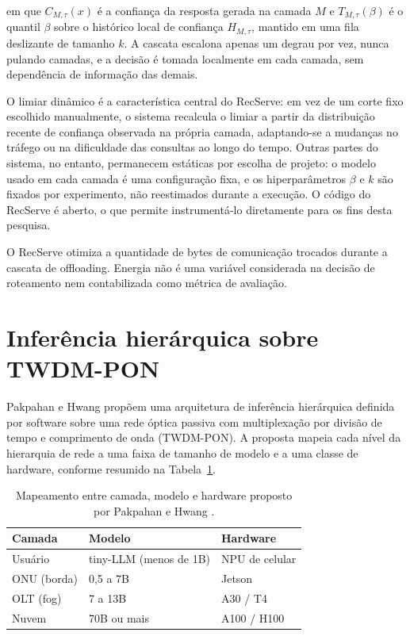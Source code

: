 \documentclass[cic,dipl]{infufrgs}
\begin{document}
em que $C_{M,\tau}(x)$ \'e a confian\c{c}a da resposta gerada na camada
$M$ e $T_{M,\tau}(\beta)$ \'e o quantil $\beta$ sobre o hist\'orico local
de confian\c{c}a $H_{M,\tau}$, mantido em uma fila deslizante de tamanho
$k$. A cascata escalona apenas um degrau por vez, nunca pulando
camadas, e a decis\~ao \'e tomada localmente em cada camada, sem
depend\^encia de informa\c{c}\~ao das demais.

O limiar din\^amico \'e a caracter\'istica central do RecServe: em vez de
um corte fixo escolhido manualmente, o sistema recalcula o limiar a
partir da distribui\c{c}\~ao recente de confian\c{c}a observada na
pr\'opria camada, adaptando-se a mudan\c{c}as no tr\'afego ou na
dificuldade das consultas ao longo do tempo. Outras partes do sistema,
no entanto, permanecem est\'aticas por escolha de projeto: o modelo
usado em cada camada \'e uma configura\c{c}\~ao fixa, e os
hiperpar\^ametros $\beta$ e $k$ s\~ao fixados por experimento, n\~ao
reestimados durante a execu\c{c}\~ao. O c\'odigo do RecServe \'e aberto,
o que permite instrument\'a-lo diretamente para os fins desta pesquisa.

O RecServe otimiza a quantidade de bytes de comunica\c{c}\~ao trocados
durante a cascata de offloading. Energia n\~ao \'e uma vari\'avel
considerada na decis\~ao de roteamento nem contabilizada como m\'etrica
de avalia\c{c}\~ao.

\section{Infer\^encia hier\'arquica sobre TWDM-PON}
\label{sec:pakpahan}

Pakpahan e Hwang \cite{pakpahan2026continuum} prop\~oem uma arquitetura
de infer\^encia hier\'arquica definida por software sobre uma rede
\'optica passiva com multiplexa\c{c}\~ao por divis\~ao de tempo e
comprimento de onda (TWDM-PON). A proposta mapeia cada n\'ivel da
hierarquia de rede a uma faixa de tamanho de modelo e a uma classe de
hardware, conforme resumido na Tabela~\ref{tab:pakpahan}.

\begin{table}[htbp]
  \centering
  \caption{Mapeamento entre camada, modelo e hardware proposto por Pakpahan e Hwang \cite{pakpahan2026continuum}.}
  \label{tab:pakpahan}
  \begin{tabular}{lll}
    \hline
    \textbf{Camada} & \textbf{Modelo} & \textbf{Hardware} \\
    \hline
    Usu\'ario & tiny-LLM (menos de 1B) & NPU de celular \\
    ONU (borda) & 0,5 a 7B & Jetson \\
    OLT (fog) & 7 a 13B & A30 / T4 \\
    Nuvem & 70B ou mais & A100 / H100 \\
    \hline
  \end{tabular}
\end{table}
\end{document}
